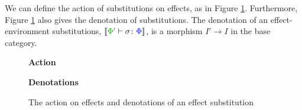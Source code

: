 \documentclass{Report}
\begin{document}
We can define the action of substitutions on effects, as in Figure \ref{EffectSubstitutionActionEffects}. Furthermore, Figure \ref{EffectSubstitutionActionEffects} also gives the denotation of substitutions. The denotation of an effect-environment substitutions, $\deno{\typerelation{\P'}{\si}{\P}}$, is a morphism $I' \rightarrow I$ in the base category.



\begin{figure}[H]
    \centering
    \begin{minipage}{0.47\textwidth}
      \begin{framed}
        \centering
        \textbf{Action}
  
      \end{framed}
    \end{minipage}
    \quad
    \begin{minipage}{0.47\textwidth}
      \begin{framed}
        \centering
        \textbf{Denotations}
  
      \end{framed}
    \end{minipage}
    \caption{The action on effects and denotations of an effect substitution}
    \label{EffectSubstitutionActionEffects}
\end{figure}
\end{document}
